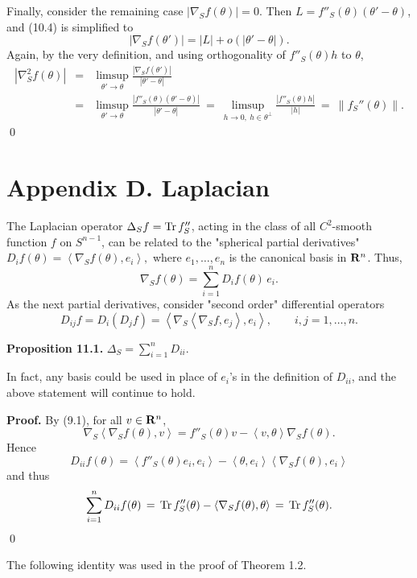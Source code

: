 \documentclass[reqno,12pt]{amsart}
\theoremstyle{plain}
\begin{document}
Finally, consider the remaining case $|\nabla_S f(\theta)| = 0$. Then
$L = f''_S(\theta)(\theta' - \theta)$, and (10.4) is simplified to
$$
|\nabla_S f(\theta')| = |L| + o(|\theta' - \theta|).
$$
Again, by the very definition, and using orthogonality of 
$f''_S(\theta)h$ to $\theta$,
\begin{eqnarray*}
|\nabla_S^2 f(\theta)|
 & = &
\limsup_{\theta' \rightarrow \theta} 
\frac{|\nabla_S f(\theta')|}{|\theta' - \theta|} \\
 & = &
\limsup_{\theta' \rightarrow \theta} 
\frac{|f''_S(\theta)(\theta' - \theta)|}{|\theta' - \theta|} \ = \
\limsup_{h \rightarrow 0, \ h \in \theta^\perp} 
\frac{|f''_S(\theta)h|}{|h|} \ = \ \|f_S''(\theta)\|.
\end{eqnarray*}
\qed

\vskip10mm
\section{{\bf Appendix D. Laplacian}}
\setcounter{equation}{0}

\vskip2mm
\noindent
The Laplacian operator $\Delta_S f = {\rm Tr}\, f''_S$, acting in the
class of all $C^2$-smooth function $f$ on $S^{n-1}$, can be related
to the "spherical partial derivatives"
$
D_i f(\theta) = \left<\nabla_S f(\theta),e_i\right>,
$
where $e_1,\dots, e_n$ is the canonical basis in ${{\bf R}}^n$. Thus,
$$
\nabla_S f(\theta) = \sum_{i=1}^n D_i f(\theta)\, e_i.
$$
As the next partial derivatives, consider "second order" differential 
operators
$$
D_{ij} f = D_i (D_j f) = \left<\nabla_S \left<\nabla_S f,e_j\right>,e_i\right>, 
\qquad i,j = 1,\dots,n.
$$

\vskip5mm
{\bf Proposition 11.1.} {\it
$
\Delta_S = \sum_{i=1}^n D_{ii}.
$
}

\vskip5mm
In fact, any basis could be used in place of $e_i$'s in the definition
of $D_{ii}$, and the above statement will continue to hold.

\vskip5mm
{\bf Proof.} By (9.1), for all $v \in {{\bf R}}^n$,
$$
\nabla_S \left<\nabla_S f(\theta),v\right> = f''_S(\theta) v - 
\left<v,\theta\right> \nabla_S f(\theta).
$$
Hence
$$
D_{ii} f(\theta) = \left<f''_S(\theta) e_i,e_i\right> - 
\left<\theta,e_i\right> \left<\nabla_S f(\theta),e_i\right>
$$
and thus
$$
\sum_{i=1}^n D_{ii} f(\theta) \, = \,
{\rm Tr}\, f''_S(\theta) - \left<\nabla_S f(\theta),\theta\right>
 \, = \, {\rm Tr}\, f''_S(\theta).
$$
\qed

\vskip2mm
The following identity was used in the proof of Theorem 1.2.
\end{document}
